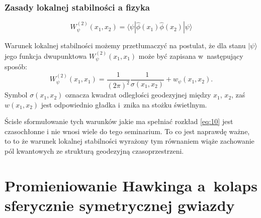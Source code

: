 \documentclass[10pt,t]{beamer}
\begin{document}
\begin{frame}
  \frametitle{Zasady lokalnej stabilności a fizyka}

  \vspace{-1em}


  \begin{equation}
    \label{eq:Promieniowanie-Hawkinga-17}
    W^{ ( 2 ) }_{ \psi }( x_{ 1 }, x_{ 2 } ) =
    \langle \psi | \widehat{ \phi }( x_{ 1 } ) \widehat{ \phi }( x_{ 2 } ) | \psi \rangle
  \end{equation}

  Warunek lokalnej stabilności możemy przetłumaczyć na postulat, że
  dla stanu $| \psi \rangle$ jego funkcja dwupunktowa
  $W^{ ( 2 ) }_{ \psi }( x_{ 1 }, x_{ 1 } )$ może być zapisana w~następujący sposób:
  \begin{equation}
    \label{eq:Promieniowanie-Hawkinga-18}
    W^{ ( 2 ) }_{ \psi }( x_{ 1 }, x_{ 1 } ) =
    \frac{ 1 }{ ( 2 \pi )^{ 2 } } \frac{ 1 }{ \sigma( x_{ 1 }, x_{ 2 } ) }
    + w_{ \psi }( x_{ 1 }, x_{ 2 } ).
  \end{equation}
  Symbol $\sigma( x_{ 1 }, x_{ 2 } )$ oznacza kwadrat odległości
  geodezyjnej między $x_{ 1 }$, $x_{ 2 }$, zaś $w( x_{ 1 }, x_{ 2 } )$
  jest odpowiednio gładka i~znika na stożku świetlnym.

  Ścisłe sformułowanie tych warunków jakie ma spełniać rozkład
  \eqref{eq:10} jest czasochłonne i nie wnosi wiele do tego
  seminarium. To co jest naprawdę ważne, to to że warunek lokalnej
  stabilności wyrażony tym równaniem wiąże zachowanie pól kwantowych
  ze strukturą geodezyjną czasoprzestrzeni.

\end{frame}










\section{Promieniowanie Hawkinga a~kolaps sferycznie symetrycznej
  gwiazdy}
\end{document}
